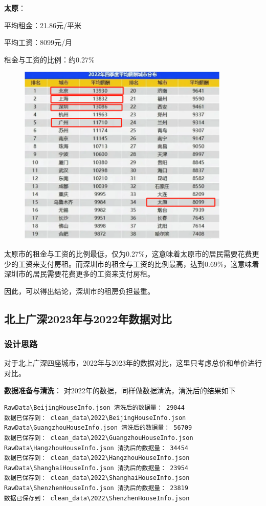 \documentclass[lang=cn,11pt,a4paper]{elegantpaper}
\begin{document}
\textbf{太原}：

平均租金：21.86元/平米

平均工资：8099元/月

租金与工资的比例：约0.27\%

\begin{figure}[H]
    \centering
    \includegraphics[width=0.9\textwidth]{image/平均薪酬.png}
\end{figure}

太原市的租金与工资的比例最低，仅为0.27\%，这意味着太原市的居民需要花费更少的工资来支付房租。而深圳市的租金与工资的比例最高，达到0.69\%，这意味着深圳市的居民需要花费更多的工资来支付房租。

因此，可以得出结论，深圳市的租房负担最重。

\subsection{北上广深2023年与2022年数据对比}

\subsubsection{设计思路}

对于北上广深四座城市，2022年与2023年的数据对比，这里只考虑总价和单价进行对比。

\textbf{数据准备与清洗}：
对2022年的数据，同样做数据清洗，清洗后的结果如下

\begin{lstlisting}[language=text]
RawData\BeijingHouseInfo.json 清洗后的数据量： 29044
数据已保存到： clean_data\2022\BeijingHouseInfo.json
RawData\GuangzhouHouseInfo.json 清洗后的数据量： 56709
数据已保存到： clean_data\2022\GuangzhouHouseInfo.json
RawData\HangzhouHouseInfo.json 清洗后的数据量： 34454
数据已保存到： clean_data\2022\HangzhouHouseInfo.json
RawData\ShanghaiHouseInfo.json 清洗后的数据量： 23954
数据已保存到： clean_data\2022\ShanghaiHouseInfo.json
RawData\ShenzhenHouseInfo.json 清洗后的数据量： 23819
数据已保存到： clean_data\2022\ShenzhenHouseInfo.json
\end{lstlisting}
\end{document}
